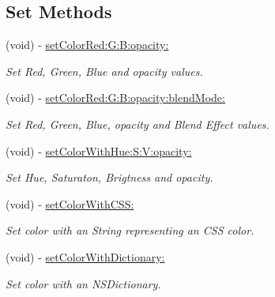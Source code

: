 \subsection*{Set Methods}
\begin{DoxyCompactItemize}
\item 
(void) -\/ \hyperlink{interface_j_p_color_a0a99e0e61f21bb33cc7e4342d7ab950d}{setColorRed:G:B:opacity:}
\begin{DoxyCompactList}\small\item\em Set Red, Green, Blue and opacity values. \item\end{DoxyCompactList}\item 
(void) -\/ \hyperlink{interface_j_p_color_aead8ca7007e2ed10f75f569bc8d652fb}{setColorRed:G:B:opacity:blendMode:}
\begin{DoxyCompactList}\small\item\em Set Red, Green, Blue, opacity and Blend Effect values. \item\end{DoxyCompactList}\item 
(void) -\/ \hyperlink{interface_j_p_color_ab2b12824d02c5203ac44dcd9784c4008}{setColorWithHue:S:V:opacity:}
\begin{DoxyCompactList}\small\item\em Set Hue, Saturaton, Brigtness and opacity. \item\end{DoxyCompactList}\item 
(void) -\/ \hyperlink{interface_j_p_color_adbab2d8cf2734971130ccbf9feda9d1a}{setColorWithCSS:}
\begin{DoxyCompactList}\small\item\em Set color with an String representing an CSS color. \item\end{DoxyCompactList}\item 
(void) -\/ \hyperlink{interface_j_p_color_acb1f82a97662b72baaf316ff6f9eb4bb}{setColorWithDictionary:}
\begin{DoxyCompactList}\small\item\em Set color with an NSDictionary. \item\end{DoxyCompactList}\end{DoxyCompactItemize}
